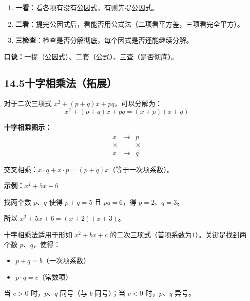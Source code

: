 \documentclass[12pt, a4paper]{ctexart}
\begin{document}
\begin{tipbox}[因式分解的一般步骤]
\begin{enumerate}[nosep]
  \item \textbf{一看}：看各项有没有公因式，有则先提公因式。
  \item \textbf{二看}：提完公因式后，看能否用公式法（二项看平方差，三项看完全平方）。
  \item \textbf{三检查}：检查是否分解彻底，每个因式是否还能继续分解。
\end{enumerate}
\textbf{口诀：}一提（公因式）、二套（公式）、三查（是否彻底）。
\end{tipbox}

\subsection*{14.5\quad 十字相乘法（拓展）}

\begin{knowledgebox}[十字相乘法]
对于二次三项式 $x^2 + (p+q)x + pq$，可以分解为：
$$\boxed{x^2 + (p+q)x + pq = (x + p)(x + q)}$$

\textbf{十字相乘图示：}
$$\begin{array}{ccc}
x & \xrightarrow{\quad} & p \\
\times & & \times \\
x & \xrightarrow{\quad} & q
\end{array}$$

交叉相乘：$x \cdot q + x \cdot p = (p+q)x$（等于一次项系数）。

\textbf{示例：}$x^2 + 5x + 6$

找两个数 $p$、$q$ 使得 $p + q = 5$ 且 $pq = 6$，得 $p = 2$、$q = 3$。

所以 $x^2 + 5x + 6 = (x+2)(x+3)$。
\end{knowledgebox}

\begin{tipbox}[十字相乘法的适用条件]
十字相乘法适用于形如 $x^2 + bx + c$ 的二次三项式（首项系数为$1$）。关键是找到两个数 $p$、$q$，使得：
\begin{itemize}[nosep]
  \item $p + q = b$（一次项系数）
  \item $p \cdot q = c$（常数项）
\end{itemize}
当 $c > 0$ 时，$p$、$q$ 同号（与 $b$ 同号）；当 $c < 0$ 时，$p$、$q$ 异号。
\end{tipbox}

\end{document}
